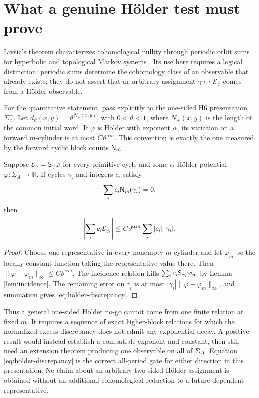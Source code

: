 \section{What a genuine H\"older test must prove}

Liv\v{s}ic's theorem characterizes cohomological nullity through periodic
orbit sums for hyperbolic and topological Markov systems
\citep{Livshits1972}.  Its use here requires a logical distinction: periodic
sums determine the cohomology class of an observable that already exists;
they do not assert that an arbitrary assignment \(\gamma\mapsto\mathcal E_\gamma\)
comes from a H\"older observable.

For the quantitative statement, pass explicitly to the one-sided H6
presentation \(\Sigma_A^+\).  Let
\(d_\vartheta(x,y)=\vartheta^{N_+(x,y)}\), with \(0<\vartheta<1\), where
\(N_+(x,y)\) is the length of the common initial word.  If \(\varphi\) is
H\"older with exponent \(\alpha\), its variation on a forward
\(m\)-cylinder is at most \(C\vartheta^{\alpha m}\).  This convention is
exactly the one measured by the forward cyclic block counts \(\mathsf N_m\).

\begin{theorem}\label{thm:holder-gate}
Suppose \(\mathcal E_\gamma=\mathsf S_\gamma\varphi\) for every primitive cycle and
some \(\alpha\)-H\"older potential \(\varphi:\Sigma_A^+\to\mathbb R\).  If cycles \(\gamma_i\) and
integers \(c_i\) satisfy
\begin{equation}\label{eq:m-relation}
 \sum_i c_i\mathsf N_m(\gamma_i)=0,
\end{equation}
then
\begin{equation}\label{eq:holder-discrepancy}
 \left|\sum_i c_i\mathcal E_{\gamma_i}\right|
 \leq C\vartheta^{\alpha m}
 \sum_i |c_i|\,|\gamma_i|.
\end{equation}
\end{theorem}

\begin{proof}
Choose one representative in every nonempty \(m\)-cylinder and let
\(\varphi_m\) be the locally constant function taking the representative
value there.  Then
\(\|\varphi-\varphi_m\|_\infty\leq C\vartheta^{\alpha m}\).
The incidence relation kills
\(\sum_i c_i\mathsf S_{\gamma_i}\varphi_m\) by Lemma
\ref{lem:incidence}.  The remaining error on \(\gamma_i\) is at most
\(|\gamma_i|\|\varphi-\varphi_m\|_\infty\), and summation gives
\eqref{eq:holder-discrepancy}.
\end{proof}

Thus a general one-sided H\"older no-go cannot come from one finite relation at fixed
\(m\).  It requires a sequence of exact higher-block relations for which the
normalized excess discrepancy does not admit any exponential decay.  A
positive result would instead establish a compatible exponent and constant,
then still need an extension theorem producing one observable on all of
\(\Sigma_A\).  Equation \eqref{eq:holder-discrepancy} is the correct
all-period gate for either direction in this presentation.  No claim about
an arbitrary two-sided H\"older assignment is obtained without an additional
cohomological reduction to a future-dependent representative.
